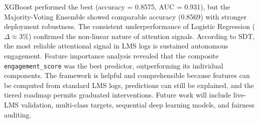 \documentclass[conference]{IEEEtran}
\begin{document}
XGBoost performed the best (accuracy = 0.8575, AUC = 0.931), but the Majority-Voting Ensemble showed comparable accuracy (0.8569) with stronger deployment robustness. The consistent underperformance of Logistic Regression ($\Delta \approx 3\%$) confirmed the non-linear nature of attention signals. According to SDT, the most reliable attentional signal in LMS logs is sustained autonomous engagement. Feature importance analysis revealed that the composite \texttt{engagement\_score} was the best predictor, outperforming its individual components.
The framework is helpful and comprehensible because features can be computed from standard LMS logs, predictions can still be explained, and the tiered roadmap permits graduated interventions. Future work will include live-LMS validation, multi-class targets, sequential deep learning models, and fairness auditing.
\end{document}
